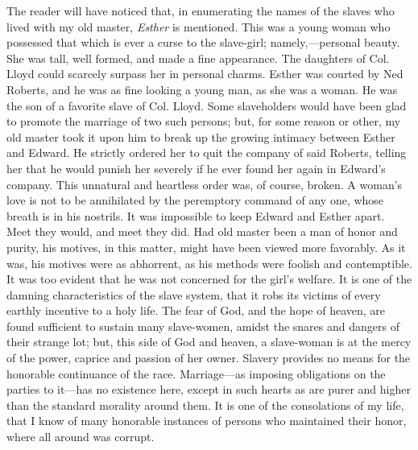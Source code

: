 The reader will have noticed that, in enumerating the names of the
slaves who lived with my old master, \emph{Esther} is mentioned. This
was a young woman who possessed that which is ever a curse to the
slave-girl; namely,---personal beauty. She was tall, well formed, and
made a fine appearance. The daughters of Col. Lloyd could scarcely
surpass her in personal charms. Esther was courted by Ned Roberts, and
he was as fine looking a young man, as she was a woman. He was the son
of a favorite slave of Col. Lloyd. Some slaveholders would have been
glad to promote the marriage of two such persons; but, for some reason
or other, my old master took it upon him to break up the growing
intimacy between Esther and Edward. {\protect\hypertarget{86}{}{}}He
strictly ordered her to quit the company of said Roberts, telling her
that he would punish her severely if he ever found her again in Edward's
company. This unnatural and heartless order was, of course, broken. A
woman's love is not to be annihilated by the peremptory command of any
one, whose breath is in his nostrils. It was impossible to keep Edward
and Esther apart. Meet they would, and meet they did. Had old master
been a man of honor and purity, his motives, in this matter, might have
been viewed more favorably. As it was, his motives were as abhorrent, as
his methods were foolish and contemptible. It was too evident that he
was not concerned for the girl's welfare. It is one of the damning
characteristics of the slave system, that it robs its victims of every
earthly incentive to a holy life. The fear of God, and the hope of
heaven, are found sufficient to sustain many slave-women, amidst the
snares and dangers of their strange lot; but, this side of God and
heaven, a slave-woman is at the mercy of the power, caprice and passion
of her owner. Slavery provides no means for the honorable continuance of
the race. Marriage---as imposing obligations on the parties to it---has
no existence here, except in such hearts as are purer and higher than
the standard morality around them. It is one of the consolations of my
life, that I know of many honorable instances of persons who maintained
their honor, where all around was corrupt.


